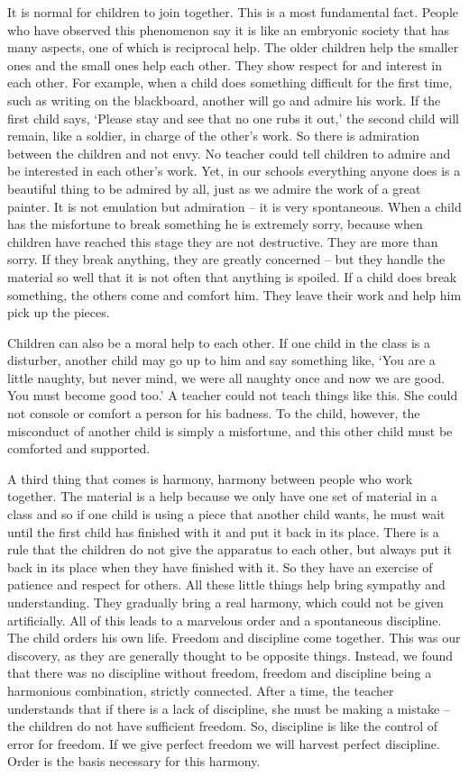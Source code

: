 \documentclass[lang=cn,10pt]{elegantbook}
\begin{document}
It is normal for children to join together. This is a most fundamental fact. People who have observed this phenomenon say it is like an embryonic society that has many aspects, one of which is reciprocal help. The older children help the smaller ones and the small ones help each other. They show respect for and interest in each other. For example, when a child does something difficult for the first time, such as writing on the blackboard, another will go and admire his work. If the first child says, ‘Please stay and see that no one rubs it out,’ the second child will remain, like a soldier, in charge of the other’s work. So there is admiration between the children and not envy. No teacher could tell children to admire and be interested in each other's work. Yet, in our schools everything anyone does is a beautiful thing to be admired by all, just as we admire the work of a great painter. It is not emulation but admiration – it is very spontaneous. When a child has the misfortune to break something he is extremely sorry, because when children have reached this stage they are not destructive. They are more than sorry. If they break anything, they are greatly concerned – but they handle the material so well that it is not often that anything is spoiled. If a child does break something, the others come and comfort him. They leave their work and help him pick up the pieces.

Children can also be a moral help to each other. If one child in the class is a disturber, another child may go up to him and say something like, ‘You are a little naughty, but never mind, we were all naughty once and now we are good. You must become good too.’ A teacher could not teach things like this. She could not console or comfort a person for his badness. To the child, however, the misconduct of another child is simply a misfortune, and this other child must be comforted and supported.

A third thing that comes is harmony, harmony between people who work together. The material is a help because we only have one set of material in a class and so if one child is using a piece that another child wants, he must wait until the first child has finished with it and put it back in its place. There is a rule that the children do not give the apparatus to each other, but always put it back in its place when they have finished with it. So they have an exercise of patience and respect for others. All these little things help bring sympathy and understanding. They gradually bring a real harmony, which could not be given artificially. All of this leads to a marvelous order and a spontaneous discipline. The child orders his own life. Freedom and discipline come together. This was our discovery, as they are generally thought to be opposite things. Instead, we found that there was no discipline without freedom, freedom and discipline being a harmonious combination, strictly connected. After a time, the teacher understands that if there is a lack of discipline, she must be making a mistake – the children do not have sufficient freedom. So, discipline is like the control of error for freedom. If we give perfect freedom we will harvest perfect discipline. Order is the basis necessary for this harmony.
\end{document}
